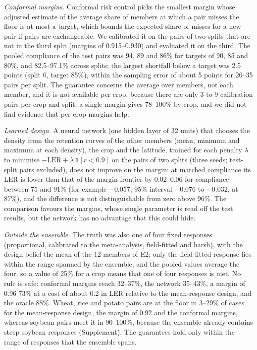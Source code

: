 \emph{Conformal margins.} Conformal risk control \citep{angelopoulos2024} picks the smallest margin whose adjusted estimate of the average share of members at which a pair misses the floor is at most a target, which bounds the expected share of misses for a new pair if pairs are exchangeable. We calibrated it on the pairs of two splits that are not in the third split (margins of 0.915--0.930) and evaluated it on the third. The pooled compliance of the test pairs was 94, 89 and 86\% for targets of 90, 85 and 80\%, and 82.5--97.1\% across splits; the largest shortfall below a target was 2.5 points (split 0, target 85\%), within the sampling error of about 5 points for 26--35 pairs per split. The guarantee concerns the average over members, not each member, and it is not available per crop, because there are only 3 to 9 calibration pairs per crop and split: a single margin gives 78--100\% by crop, and we did not find evidence that per-crop margins help.

\emph{Learned design.} A neural network (one hidden layer of 32 units) that chooses the density from the retention curves of the other members (mean, minimum and maximum at each density), the crop and the latitude, trained for each penalty $\lambda$ to minimise $-\mathrm{LER}+\lambda\,\mathbf{1}[r<0.9]$ on the pairs of two splits (three seeds; test-split pairs excluded), does not improve on the margin: at matched compliance its LER is lower than that of the margin frontier by 0.02--0.06 for compliance between 75 and 91\% (for example $-0.057$, 95\% interval $-0.076$ to $-0.032$, at 87\%), and the difference is not distinguishable from zero above 96\%. The comparison favours the margins, whose single parameter is read off the test results, but the network has no advantage that this could hide.

\emph{Outside the ensemble.} The truth was also one of four fixed responses (proportional, calibrated to the meta-analysis, field-fitted and harsh), with the design belief the mean of the 12 members of E2; only the field-fitted response lies within the range spanned by the ensemble, and the pooled values average the four, so a value of 25\% for a crop means that one of four responses is met. No rule is safe: conformal margins reach 32--37\%, the network 35--43\%, a margin of 0.96 73\% at a cost of about 0.2 in LER relative to the mean-response design, and the oracle 88\%. Wheat, rice and potato pairs are at the floor in 3--29\% of cases for the mean-response design, the margin of 0.92 and the conformal margins, whereas soybean pairs meet it in 90--100\%, because the ensemble already contains steep soybean responses (Supplement). The guarantees hold only within the range of responses that the ensemble spans.

